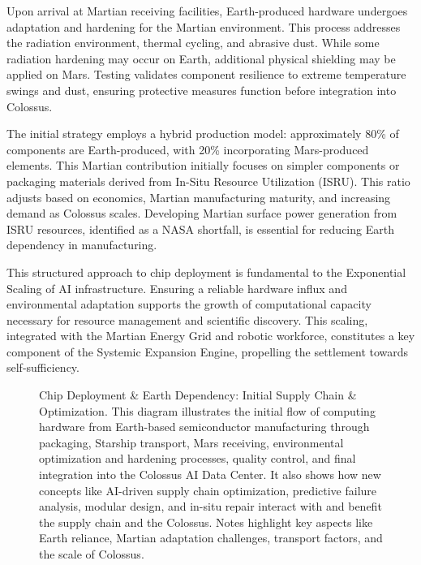 \documentclass[fontsize=10pt, oneside, DIV=calc]{scrartcl}
\begin{document}
\medskip

\noindent
Upon arrival at Martian receiving facilities, Earth-produced hardware undergoes adaptation and hardening for the Martian environment. This process addresses the radiation environment, thermal cycling, and abrasive dust. While some radiation hardening may occur on Earth, additional physical shielding may be applied on Mars. Testing validates component resilience to extreme temperature swings and dust, ensuring protective measures function before integration into Colossus.

\medskip

\noindent
The initial strategy employs a hybrid production model: approximately 80\% of components are Earth-produced, with 20\% incorporating Mars-produced elements. This Martian contribution initially focuses on simpler components or packaging materials derived from In-Situ Resource Utilization (ISRU). This ratio adjusts based on economics, Martian manufacturing maturity, and increasing demand as Colossus scales. Developing Martian surface power generation from ISRU resources, identified as a NASA shortfall, is essential for reducing Earth dependency in manufacturing.

\medskip

\noindent
This structured approach to chip deployment is fundamental to the Exponential Scaling of AI infrastructure. Ensuring a reliable hardware influx and environmental adaptation supports the growth of computational capacity necessary for resource management and scientific discovery. This scaling, integrated with the Martian Energy Grid and robotic workforce, constitutes a key component of the Systemic Expansion Engine, propelling the settlement towards self-sufficiency.



\begin{figure}[H]
  \centering
  \noindent
  \begin{minipage}{\textwidth}
    \centering
    \caption{Chip Deployment \& Earth Dependency: Initial Supply Chain \& Optimization. This diagram illustrates the initial flow of computing hardware from Earth-based semiconductor manufacturing through packaging, Starship transport, Mars receiving, environmental optimization and hardening processes, quality control, and final integration into the Colossus AI Data Center. It also shows how new concepts like AI-driven supply chain optimization, predictive failure analysis, modular design, and in-situ repair interact with and benefit the supply chain and the Colossus. Notes highlight key aspects like Earth reliance, Martian adaptation challenges, transport factors, and the scale of Colossus.}
  \end{minipage}
\end{figure}
\end{document}
